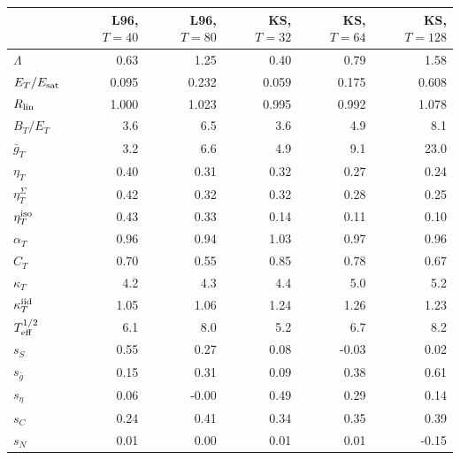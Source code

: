 \begin{tabular}{lrrrrr}
\toprule
 & L96, $T=40$ & L96, $T=80$ & KS, $T=32$ & KS, $T=64$ & KS, $T=128$\\
\midrule
$\Lambda$ & 0.63 & 1.25 & 0.40 & 0.79 & 1.58\\
$E_T/E_{\rm sat}$ & 0.095 & 0.232 & 0.059 & 0.175 & 0.608\\
$R_{\rm lin}$ & 1.000 & 1.023 & 0.995 & 0.992 & 1.078\\
\midrule
$B_T/E_T$ & 3.6 & 6.5 & 3.6 & 4.9 & 8.1\\
$\bar g_T$ & 3.2 & 6.6 & 4.9 & 9.1 & 23.0\\
$\eta_T$ & 0.40 & 0.31 & 0.32 & 0.27 & 0.24\\
$\eta^\Sigma_T$ & 0.42 & 0.32 & 0.32 & 0.28 & 0.25\\
$\eta^{\rm iso}_T$ & 0.43 & 0.33 & 0.14 & 0.11 & 0.10\\
$\alpha_T$ & 0.96 & 0.94 & 1.03 & 0.97 & 0.96\\
$C_T$ & 0.70 & 0.55 & 0.85 & 0.78 & 0.67\\
$\kappa_T$ & 4.2 & 4.3 & 4.4 & 5.0 & 5.2\\
$\kappa^{\rm iid}_T$ & 1.05 & 1.06 & 1.24 & 1.26 & 1.23\\
$T_{\rm eff}^{1/2}$ & 6.1 & 8.0 & 5.2 & 6.7 & 8.2\\
\midrule
$s_S$ & 0.55 & 0.27 & 0.08 & -0.03 & 0.02\\
$s_{\bar g}$ & 0.15 & 0.31 & 0.09 & 0.38 & 0.61\\
$s_\eta$ & 0.06 & -0.00 & 0.49 & 0.29 & 0.14\\
$s_C$ & 0.24 & 0.41 & 0.34 & 0.35 & 0.39\\
$s_N$ & 0.01 & 0.00 & 0.01 & 0.01 & -0.15\\
\bottomrule
\end{tabular}
